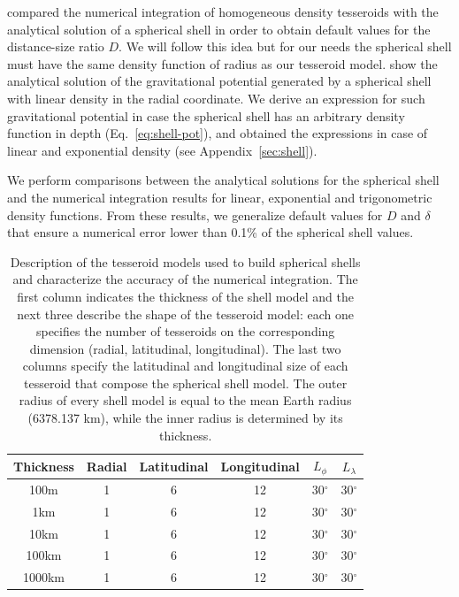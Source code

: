 \documentclass[extra, referee]{gji}
\begin{document}
\citet{Uieda2016} compared the numerical integration of homogeneous density tesseroids
with the analytical solution of a spherical shell \citep{Mikuska2006, Grombein2013} in
order to obtain default values for the distance-size ratio $D$.
We will follow this idea but for our needs the spherical shell must
have the same density function of radius as our tesseroid model.
\citet{Lin2018} show the analytical solution of the gravitational potential generated by
a spherical shell with linear density in the radial coordinate.
We derive an expression for such gravitational potential in case the spherical shell has
an arbitrary density function in depth (Eq.~\ref{eq:shell-pot}), and obtained the
expressions in case of linear and exponential density (see Appendix~\ref{sec:shell}).

We perform comparisons between the analytical solutions for the spherical shell and the
numerical integration results for linear, exponential and trigonometric density
functions.
From these results, we generalize default values for $D$ and $\delta$ that ensure a
numerical error lower than 0.1\% of the spherical shell values.

\begin{table}
\caption{
    Description of the tesseroid models used to build spherical shells and characterize
    the accuracy of the numerical integration.
    The first column indicates the thickness of the shell model and the next three
    describe the shape of the tesseroid model: each one specifies the number of
    tesseroids on the corresponding dimension (radial, latitudinal, longitudinal).
    The last two columns specify the latitudinal and longitudinal size of each
    tesseroid that compose the spherical shell model.
    The outer radius of every shell model is equal to the mean Earth radius (6378.137
    km), while the inner radius is determined by its thickness.
}
\label{tab:shell-models}
\begin{tabular}{cccccc}
    Thickness & Radial & Latitudinal & Longitudinal & $L_\phi$ & $L_\lambda$ \\ \hline
    100m   & 1 & 6 & 12 & 30$^\circ$ & 30$^\circ$ \\
    1km    & 1 & 6 & 12 & 30$^\circ$ & 30$^\circ$ \\
    10km   & 1 & 6 & 12 & 30$^\circ$ & 30$^\circ$ \\
    100km  & 1 & 6 & 12 & 30$^\circ$ & 30$^\circ$ \\
    1000km & 1 & 6 & 12 & 30$^\circ$ & 30$^\circ$ \\
\end{tabular}
\end{table}
\end{document}
